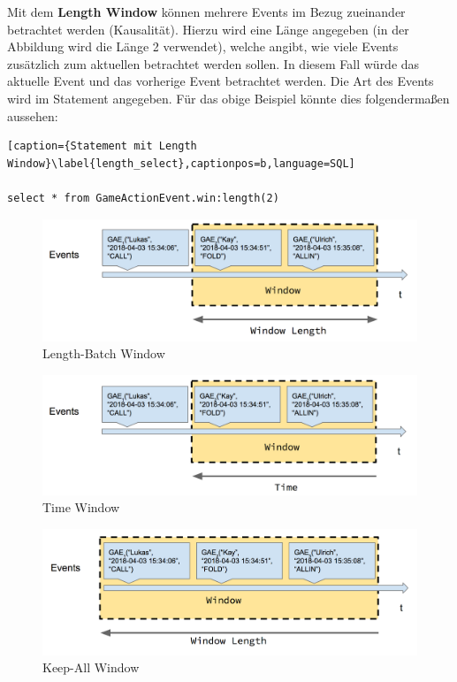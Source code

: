 Mit dem \textbf{Length Window} können mehrere Events im Bezug zueinander betrachtet werden (Kausalität). Hierzu wird eine Länge angegeben (in der Abbildung wird die Länge 2 verwendet), welche angibt, wie viele Events zusätzlich zum aktuellen betrachtet werden sollen. In diesem Fall würde das aktuelle Event und das vorherige Event betrachtet werden. Die Art des Events wird im Statement angegeben. Für das obige Beispiel könnte dies folgendermaßen aussehen:

\begin{lstlisting}[caption={Statement mit Length Window}\label{length_select},captionpos=b,language=SQL]

select * from GameActionEvent.win:length(2)

\end{lstlisting}

\begin{figure}[ht]
	\centering
	\includegraphics[width=\textwidth,height=\textheight,keepaspectratio]{images/data_window_length_batch.png}
	\caption{Length-Batch Window}
	\label{LengthBatchWindow}
\end{figure}

\begin{figure}[ht]
	\centering
	\includegraphics[width=\textwidth,height=\textheight,keepaspectratio]{images/data_window_time.png}
	\caption{Time Window}
	\label{TimeWindow}
\end{figure}

\begin{figure}[ht]
	\centering
	\includegraphics[width=\textwidth,height=\textheight,keepaspectratio]{images/data_window_keep_all.png}
	\caption{Keep-All Window}
	\label{KeepAllWindow}
\end{figure}

